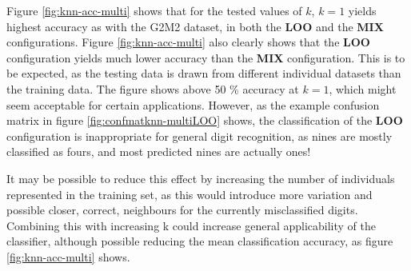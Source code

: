 Figure \ref{fig:knn-acc-multi} shows that for the tested values of \(k\),
\(k=1\) yields highest accuracy as with the G2M2 dataset,
in both the \textbf{LOO} and the \textbf{MIX} configurations.
Figure \ref{fig:knn-acc-multi} also clearly shows that the \textbf{LOO} configuration
yields much lower accuracy than the \textbf{MIX} configuration.
This is to be expected, as the testing data is drawn from different individual datasets
than the training data. The figure shows above 50 \% accuracy at \(k=1\),
which might seem acceptable for certain applications.
However, as the example confusion matrix in figure \ref{fig:confmatknn-multiLOO} shows,
the classification of the \textbf{LOO} configuration is inappropriate
for general digit recognition, as nines are mostly classified as fours,
and most predicted nines are actually ones!

It may be possible to reduce this effect by increasing the number
of individuals represented in the training set, as this would introduce more
variation and possible closer, correct, neighbours for the currently
misclassified digits.
Combining this with increasing k could increase general applicability of the classifier,
although possible reducing the mean classification accuracy,
as figure \ref{fig:knn-acc-multi} shows.